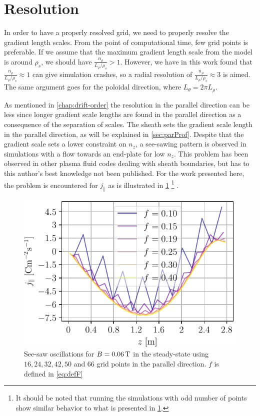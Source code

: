 \section{Resolution}
\label{sec:resolution}
%
In order to have a properly resolved grid, we need to properly resolve the gradient length scales.
From the point of computational time, few grid points is preferable.
If we assume that the maximum gradient length scale from the model is around $\rho_s$, we should have $\frac{n_\rho}{L_\rho/\rho_s}>1$.
However, we have in this work found that $\frac{n_\rho}{L_\rho/\rho_s}\approx1$ can give simulation crashes, so a radial resolution of $\frac{n_\rho}{L_\rho/\rho_s}\approx3$ is aimed.
The same argument goes for the poloidal direction, where $L_\theta=2\pi L_\rho$.

As mentioned in \cref{chap:drift-order} the resolution in the parallel direction can be less since longer gradient scale lengths are found in the parallel direction as a consequence of the separation of scales.
The sheath sets the gradient scale length in the parallel direction, as will be explained in \cref{sec:parProf}.
Despite that the gradient scale sets a lower constraint on $n_z$, a see-sawing pattern is observed in simulations with a flow towards an end-plate for low $n_z$.
This problem has been observed in other plasma fluid codes dealing with sheath boundaries, but has to this author's best knowledge not been published.
For the work presented here, the problem is encountered for $j_\|$ as is illustrated in \cref{fig:see-saw}%
\footnote{It should be noted that running the simulations with odd number of points show similar behavior to what is presented in \cref{fig:see-saw}.}%
%
.
%
\begin{figure}[htb]
    \centering
    \includegraphics{fig/results/jParRipple006}
    \caption{See-saw oscillations for $B=0.06\, \text{T}$ in the steady-state using $16, 24, 32, 42, 50$ and $66$ grid points in the parallel direction.
        $f$ is defined in \cref{eq:defF}
    }
    \label{fig:see-saw}
\end{figure}
%

